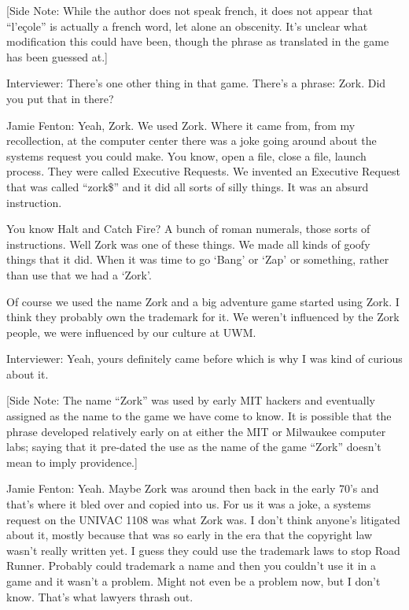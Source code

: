 [Side Note: While the author does not speak french, it does not appear that “l’eçole” is actually a french word, let alone an obscenity. It’s unclear what modification this could have been, though the phrase as translated in the game has been guessed at.]

\textcolor{interviewer}{Interviewer:} There’s one other thing in that game. There’s a phrase: Zork. Did you put that in there?

\textcolor{interviewee}{Jamie Fenton:} Yeah, Zork. We used Zork. Where it came from, from my recollection, at the computer center there was a joke going around about the systems request you could make. You know, open a file, close a file, launch process. They were called Executive Requests. We invented an Executive Request that was called “zork\$” and it did all sorts of silly things. It was an absurd instruction.

You know Halt and Catch Fire? A bunch of roman numerals, those sorts of instructions. Well Zork was one of these things. We made all kinds of goofy things that it did. When it was time to go ‘Bang’ or ‘Zap’ or something, rather than use that we had a ‘Zork’.

Of course we used the name Zork and a big adventure game started using Zork. I think they probably own the trademark for it. We weren’t influenced by the Zork people, we were influenced by our culture at UWM.

\textcolor{interviewer}{Interviewer:} Yeah, yours definitely came before which is why I was kind of curious about it.

[Side Note: The name “Zork” was used by early MIT hackers and eventually assigned as the name to the game we have come to know. It is possible that the phrase developed relatively early on at either the MIT or Milwaukee computer labs; saying that it pre-dated the use as the name of the game “Zork” doesn’t mean to imply providence.]

\textcolor{interviewee}{Jamie Fenton:} Yeah. Maybe Zork was around then back in the early 70’s and that’s where it bled over and copied into us. For us it was a joke, a systems request on the UNIVAC 1108 was what Zork was. I don’t think anyone’s litigated about it, mostly because that was so early in the era that the copyright law wasn’t really written yet. I guess they could use the trademark laws to stop Road Runner. Probably could trademark a name and then you couldn’t use it in a game and it wasn’t a problem. Might not even be a problem now, but I don’t know. That’s what lawyers thrash out.

